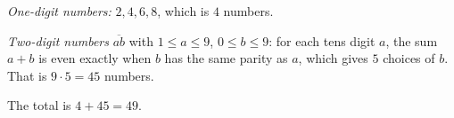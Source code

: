 \emph{One-digit numbers:} $2,4,6,8$, which is $4$ numbers.

\emph{Two-digit numbers} $\overline{ab}$ with $1\le a\le9$, $0\le b\le9$: for each tens digit $a$, the sum $a+b$ is even exactly when $b$ has the same parity as $a$, which gives $5$ choices of $b$. That is $9\cdot5=45$ numbers.

The total is $4+45=\boxed{49}$.
